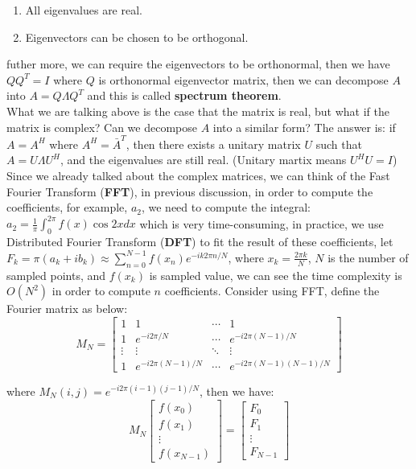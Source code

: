\documentclass{article}
\begin{document}
\begin{enumerate}
    \item All eigenvalues are real.
    \item Eigenvectors can be chosen to be orthogonal.
\end{enumerate}

futher more, we can require the eigenvectors to be orthonormal, then we have \( QQ^T = I \) where \( Q \) is orthonormal eigenvector matrix, then we can decompose \( A \) into \( A = Q\Lambda Q^T \) and this is called \textbf{spectrum theorem}.
\\

What we are talking above is the case that the matrix is real, but what if the matrix is complex? Can we decompose \( A \) into a similar form?
The answer is: if \( A = A^H \) where \( A^H = \bar{A}^T \), then there exists a unitary matrix \( U \) such that \( A = U\Lambda U^H \), and the eigenvalues are still real. (Unitary martix means \( U^H U = I \))
\\

Since we already talked about the complex matrices, we can think of the Fast Fourier Transform (\textbf{FFT}), in previous discussion, in order to compute the coefficients, for example, \( a_2 \), we need to compute the integral:
\( a_2 = \frac{1}{\pi} \int_{0}^{2\pi} f(x)\cos 2x dx \) which is very time-consuming, in practice, we use Distributed Fourier Transform (\textbf{DFT}) to fit the result of these coefficients, let \( F_k = \pi(a_k + ib_k) \approx  \sum_{n=0}^{N-1} f(x_n)e^{-ik2\pi n/N} \),
where \( x_k = \frac{2\pi k}{N} \), \( N \) is the number of sampled points, and \( f(x_k) \) is sampled value, we can see the time complexity is \( O(N^2) \) in order to compute \( n \) coefficients.
Consider using FFT, define the Fourier matrix as below:
\[  M_N = 
    \begin{bmatrix}
        1 & 1 & \cdots & 1 \\
        1 & e^{-i2\pi/N} & \cdots & e^{-i2\pi(N-1)/N} \\
        \vdots & \vdots & \ddots & \vdots \\
        1 & e^{-i2\pi(N-1)/N} & \cdots & e^{-i2\pi(N-1)(N-1)/N}
    \end{bmatrix}
\]

where \( M_N(i,j) = e^{-i2\pi (i-1)(j-1) / N} \), then we have:
\[
    M_N \begin{bmatrix}
        f(x_0) \\
        f(x_1) \\
        \vdots \\
        f(x_{N-1})
    \end{bmatrix} = \begin{bmatrix}
        F_0 \\
        F_1 \\
        \vdots \\
        F_{N-1}
    \end{bmatrix}
\]
\end{document}
